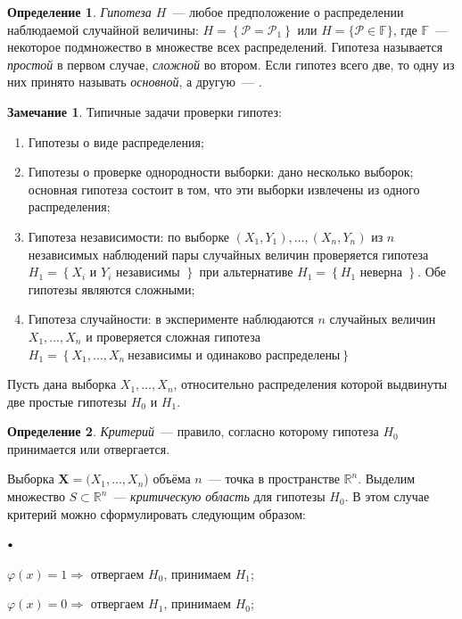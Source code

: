 \documentclass[oneside,final,14pt]{extreport}
\theoremstyle{plain}
\theoremstyle{definition}
\newtheorem*{defn}{Определение}
\newtheorem*{rmrk}{Замечание}
\theoremstyle{named}
\newcommand\sbullet[1][.5]{\mathbin{\vcenter{\hbox{\scalebox{#1}{$\bullet$}}}}}
\newenvironment{compactlist}{
\begin{list}{{$\sbullet[.75]$}}{
\setlength\partopsep{0pt}
\setlength\parskip{0pt}
\setlength\parsep{0pt}
\setlength\topsep{0pt}
\setlength\itemsep{0pt}
}
}{
\end{list}
}
\begin{document}
\begin{defn}
{\it Гипотеза $H$}~--- любое предположение о распределении наблюдаемой случайной величины: $H=\left\{\mathcal{P}=\mathcal{P}_{1}\right\}$ или $H=\{\mathcal{P} \in \mathbb{F}\}$, где $\mathbb{F}$~--- некоторое подмножество в множестве всех распределений. Гипотеза называется {\it простой} в первом случае, {\it сложной} во втором. Если гипотез всего две, то одну из них принято называть {\it основной}, а другую~--- {}.
\end{defn}

\begin{rmrk} Типичные задачи проверки гипотез:
\begin{enumerate}
    \item Гипотезы о виде распределения;
    \item Гипотезы о проверке однородности выборки: дано несколько выборок; основная гипотеза состоит в том, что эти выборки извлечены из одного распределения;
    \item Гипотеза независимости: по выборке $(X_1,Y_1), \ldots, (X_n,Y_n)$ из $n$ независимых наблюдений пары случайных величин проверяется гипотеза $H_{1}=\left\{X_{i} \text { и } Y_{i} \text { независимы }\right\}$ при альтернативе $H_{1}=\left\{H_{1} \text { неверна }\right\}$. Обе гипотезы являются сложными;
    \item Гипотеза случайности: в эксперименте наблюдаются $n$ случайных величин $X_{1}, \ldots, X_{n}$ и проверяется сложная гипотеза $H_{1}=\left\{X_{1}, \ldots, X_{n}~ \text{независимы и одинаково распределены}\right\}$
\end{enumerate}
\end{rmrk}

Пусть дана выборка $X_{1}, \ldots, X_{n}$, относительно распределения которой выдвинуты две простые гипотезы $H_{0}$ и $H_1$.
\begin{defn}
{\it Критерий}~--- правило, согласно которому гипотеза $H_0$ принимается или отвергается.
\end{defn}
Выборка $\mathbf{X} = (X_1, \ldots, X_n$) объёма $n$~--- точка в пространстве $\mathbb{R}^{n}$. Выделим множество $S \subset \mathbb{R}^{n}$~--- {\it критическую область} для гипотезы $H_0$. В этом случае критерий можно сформулировать следующим образом:
\begin{compactlist}
    \item $\varphi(x) = 1 \Rightarrow$ отвергаем $H_0$, принимаем $H_1$;
    \item $\varphi(x) = 0 \Rightarrow$ отвергаем $H_1$, принимаем $H_0$;
\end{compactlist}
\end{document}
